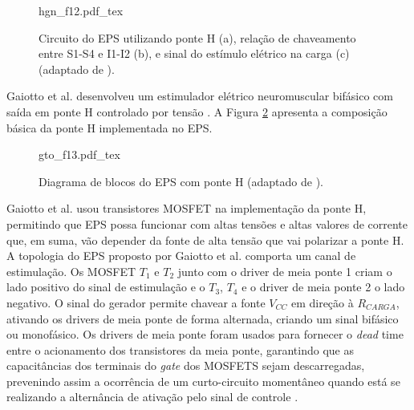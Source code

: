 
\begin{figure}
    \centering %
    \small %
    \def\svgwidth{0.9
    \columnwidth}%
    {hgn_f12.pdf_tex}
    \caption{Circuito do EPS utilizando ponte H (a), relação de chaveamento entre S1-S4 e I1-I2 (b), e sinal do estímulo elétrico na carga (c) (adaptado de \cite{Hongen2011DevelopmentRehabilitation}).}
    \label{fig:hgn_f12}
\end{figure}

Gaiotto et al. desenvolveu um estimulador elétrico neuromuscular bifásico com saída em ponte H controlado por tensão \cite{Gaiotto2012EstimuladorEletricamente}. A Figura \ref{fig:gto_f13} apresenta a composição básica da ponte H implementada no \acrshort{EPS}.

\begin{figure}
    \centering %
    \small %
    \def\svgwidth{0.9
    \columnwidth}%
    {gto_f13.pdf_tex}
    \caption{Diagrama de blocos do EPS com ponte H (adaptado de \cite{Gaiotto2012EstimuladorEletricamente}).}
    \label{fig:gto_f13}
\end{figure}

Gaiotto et al. usou transistores MOSFET na implementação da ponte H, permitindo que EPS possa funcionar com altas tensões e altas valores de corrente que, em suma, vão depender da fonte de alta tensão que vai polarizar a ponte H. A topologia do \acrshort{EPS} proposto por Gaiotto et al. comporta um canal de estimulação. Os MOSFET $T_{1}$ e $T_{2}$ junto com o driver de meia ponte 1 criam o lado positivo do sinal de estimulação e o $T_{3}$, $T_{4}$ e o driver de meia ponte 2 o lado negativo. O sinal do gerador permite chavear a fonte $V_{CC}$ em direção à $R_{CARGA}$, ativando os drivers de meia ponte de forma alternada, criando um sinal bifásico ou monofásico. Os drivers de meia ponte foram usados para fornecer o \textit{dead} time entre o acionamento dos transistores da meia ponte, garantindo que as capacitâncias dos terminais do \textit{gate} dos MOSFETS sejam descarregadas, prevenindo assim a ocorrência de um curto-circuito momentâneo quando está se realizando a alternância de ativação pelo sinal de controle \cite{Gaiotto2012EstimuladorEletricamente}.

